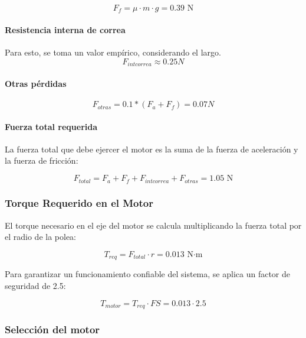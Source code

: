 \begin{equation}
    F_f = \mu \cdot m \cdot g = 0.39 \text{ N}
\end{equation}

\paragraph{Resistencia interna de correa}
Para esto, se toma un valor empírico, considerando el largo.
\[F_{intcorrea} \approx 0.25N\]
\paragraph{Otras pérdidas}

\begin{equation}
    F_{otras}= 0.1*(F_a+F_f)=0.07N
\end{equation}

\paragraph{Fuerza total requerida}

La fuerza total que debe ejercer el motor es la suma de la fuerza de aceleración y la fuerza de fricción:

\begin{equation}
    F_{total} = F_a + F_f + F_{intcorrea} + F_{otras} = 1.05 \text{ N}
\end{equation}

\subsubsection{Torque Requerido en el Motor}

El torque necesario en el eje del motor se calcula multiplicando la fuerza total por el radio de la polea:

\begin{equation}
    T_{req} = F_{total} \cdot r = 0.013\text{ N·m}
\end{equation}

Para garantizar un funcionamiento confiable del sistema, se aplica un factor de seguridad de 2.5:

\begin{equation}
    T_{motor} = T_{req} \cdot FS = 0.013 \cdot 2.5
\end{equation}

\subsubsection{Selección del motor}

